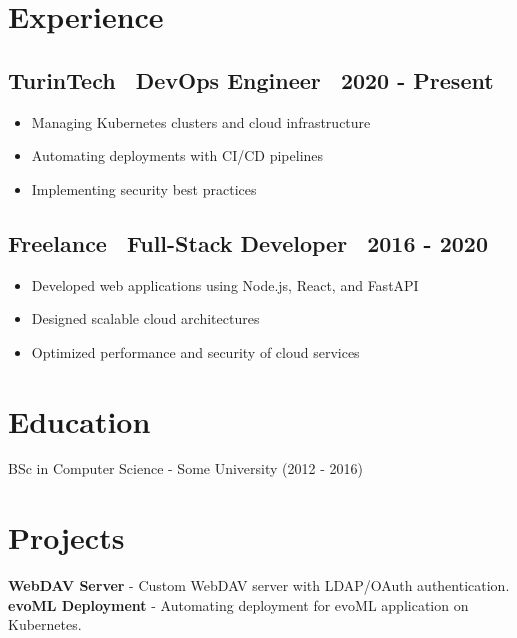 \documentclass[a4paper,10pt]{article}
\begin{document}
\section*{ Experience}
\subsection*{TurinTech \textbar\ DevOps Engineer \textbar\ 2020 - Present}
\begin{itemize}[left=0pt, label=]
    \item Managing Kubernetes clusters and cloud infrastructure
    \item Automating deployments with CI/CD pipelines
    \item Implementing security best practices
\end{itemize}

\subsection*{Freelance \textbar\ Full-Stack Developer \textbar\ 2016 - 2020}
\begin{itemize}[left=0pt, label=]
    \item Developed web applications using Node.js, React, and FastAPI
    \item Designed scalable cloud architectures
    \item Optimized performance and security of cloud services
\end{itemize}

\vspace{0pt}

\section*{ Education}
BSc in Computer Science - Some University (2012 - 2016)

\vspace{0pt}

\section*{ Projects}
\textbf{ WebDAV Server} - Custom WebDAV server with LDAP/OAuth authentication.\\
\textbf{ evoML Deployment} - Automating deployment for evoML application on Kubernetes.
\end{document}
